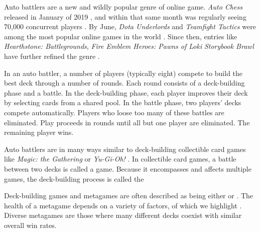 
Auto battlers are a new and wildly popular genre of online game.
\textit{Auto Chess} released in January of 2019 \cite{autochess}, and
within that same month was regularly seeing 70,000 concurrent players
\cite{auto-chess-what-and-why}. By June, \textit{Dota Underlords} and
\textit{Teamfight Tactics} were among the most popular online games in
the world \cite{autobattler-popularity}. Since then, entries like
\textit{Hearthstone: Battlegrounds}, \textit{Fire Emblem Heroes: Pawns
  of Loki} \textit{Storybook Brawl} have further refined the genre
\cite{hearthstone-battlegrounds, feh-pawnsOfLoki-video,
  storybook-brawl}.


In an auto battler, a number of players (typically eight) compete to
build the best deck through a number of rounds. Each round consists of
a deck-building phase and a battle. In the deck-building phase, each
player improves their deck by selecting cards from a shared pool. In
the battle phase, two players' decks compete automatically. Players
who loose too many of these battles are eliminated. Play proceeds in
rounds until all but one player are eliminated. The remaining player
wins.

Auto battlers are in many ways similar to deck-building collectible
card games like \textit{Magic: the Gathering} or \textit{Yu-Gi-Oh!}
\cite{magic-the-gathering, yugioh-tcg}. In collectible card games, a
battle between two decks is called a game. Because it encompasses and
affects multiple games, the deck-building process is called the

Deck-building games and metagames are often described as being either
 or . The health of a metagame
depends on a variety of factors, of which we highlight
. Diverse metagames are those where many different
decks coexist with similar overall win rates.

